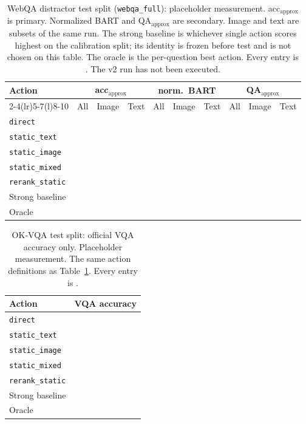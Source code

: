 \begin{table}[t]
\caption{WebQA distractor test split (\texttt{webqa\_full}): placeholder measurement.
acc$_{\mathrm{approx}}$ is primary.
Normalized BART and QA$_{\mathrm{approx}}$ are secondary.
Image and text are subsets of the same run.
The strong baseline is whichever single action scores highest on the calibration split; its identity is frozen before test and is not chosen on this table.
The oracle is the per-question best action.
Every entry is \ph{}.
The v2 run has not been executed.}
\label{tab:webqa}
\scriptsize
\setlength{\tabcolsep}{3.5pt}
\begin{tabular}{@{}lccccccccc@{}}
\toprule
Action & \multicolumn{3}{c}{acc$_{\mathrm{approx}}$} & \multicolumn{3}{c}{norm.\ BART} & \multicolumn{3}{c}{QA$_{\mathrm{approx}}$} \\
\cmidrule(lr){2-4}\cmidrule(lr){5-7}\cmidrule(l){8-10}
 & All & Image & Text & All & Image & Text & All & Image & Text \\
\midrule
\texttt{direct} & \ph{} & \ph{} & \ph{} & \ph{} & \ph{} & \ph{} & \ph{} & \ph{} & \ph{} \\
\texttt{static\_text} & \ph{} & \ph{} & \ph{} & \ph{} & \ph{} & \ph{} & \ph{} & \ph{} & \ph{} \\
\texttt{static\_image} & \ph{} & \ph{} & \ph{} & \ph{} & \ph{} & \ph{} & \ph{} & \ph{} & \ph{} \\
\texttt{static\_mixed} & \ph{} & \ph{} & \ph{} & \ph{} & \ph{} & \ph{} & \ph{} & \ph{} & \ph{} \\
\texttt{rerank\_static} & \ph{} & \ph{} & \ph{} & \ph{} & \ph{} & \ph{} & \ph{} & \ph{} & \ph{} \\
Strong baseline & \ph{} & \ph{} & \ph{} & \ph{} & \ph{} & \ph{} & \ph{} & \ph{} & \ph{} \\
Oracle & \ph{} & \ph{} & \ph{} & \ph{} & \ph{} & \ph{} & \ph{} & \ph{} & \ph{} \\
\bottomrule
\end{tabular}
\end{table}

\begin{table}[t]
\caption{OK-VQA test split: official VQA accuracy only.
Placeholder measurement.
The same action definitions as Table~\ref{tab:webqa}.
Every entry is \ph{}.}
\label{tab:okvqa}
\small
\begin{tabular}{@{}lc@{}}
\toprule
Action & VQA accuracy \\
\midrule
\texttt{direct} & \ph{} \\
\texttt{static\_text} & \ph{} \\
\texttt{static\_image} & \ph{} \\
\texttt{static\_mixed} & \ph{} \\
\texttt{rerank\_static} & \ph{} \\
Strong baseline & \ph{} \\
Oracle & \ph{} \\
\bottomrule
\end{tabular}
\end{table}

